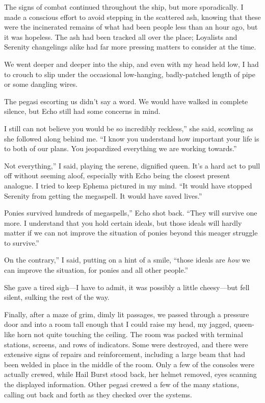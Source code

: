 The signs of combat continued throughout the ship, but more sporadically. I made a conscious effort to avoid stepping in the scattered ash, knowing that these were the incinerated remains of what had been people less than an hour ago, but it was hopeless. The ash had been tracked all over the place; Loyalists and Serenity changelings alike had far more pressing matters to consider at the time.

We went deeper and deeper into the ship, and even with my head held low, I had to crouch to slip under the occasional low-hanging, badly-patched length of pipe or some dangling wires.

The pegasi escorting us didn’t say a word. We would have walked in complete silence, but Echo still had some concerns in mind.

\leavevmode{}I still can not believe you would be so incredibly reckless,” she said, scowling as she followed along behind me. “I know you understand how important your life is to both of our plans. You jeopardized everything we are working towards.”

\leavevmode{}Not everything,” I said, playing the serene, dignified queen. It’s a hard act to pull off without seeming aloof, especially with Echo being the closest present analogue. I tried to keep Ephema pictured in my mind. “It would have stopped Serenity from getting the megaspell. It would have saved lives.”

\leavevmode{}Ponies survived hundreds of megaspells,” Echo shot back. “They will survive one more. I understand that you hold certain ideals, but those ideals will hardly matter if we can not improve the situation of ponies beyond this meager struggle to survive.”

\leavevmode{}On the contrary,” I said, putting on a hint of a smile, “those ideals are \textit{how} we can improve the situation, for ponies and all other people.”

She gave a tired sigh—I have to admit, it was possibly a little cheesy—but fell silent, sulking the rest of the way.

Finally, after a maze of grim, dimly lit passages, we passed through a pressure door and into a room tall enough that I could raise my head, my jagged, queen-like horn not quite touching the ceiling. The room was packed with terminal stations, screens, and rows of indicators. Some were destroyed, and there were extensive signs of repairs and reinforcement, including a large beam that had been welded in place in the middle of the room. Only a few of the consoles were actually crewed, while Hail Burst stood back, her helmet removed, eyes scanning the displayed information. Other pegasi crewed a few of the many stations, calling out back and forth as they checked over the systems.

